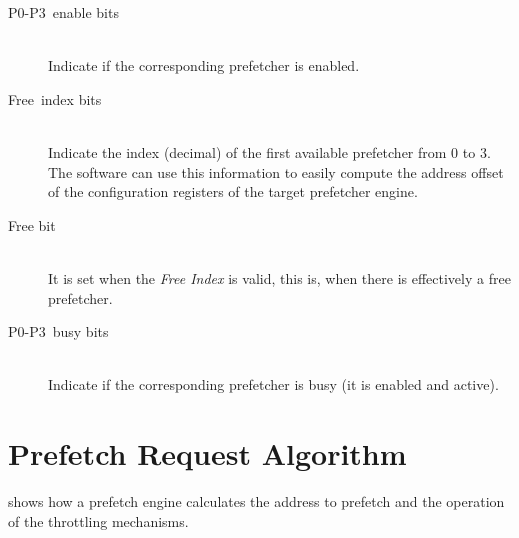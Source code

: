 \documentclass[10pt,titlepage,twoside]{book}
\begin{document}
\begin{description}
  \item [\textsf{P0-P3~enable bits}] \mbox{}\\
    Indicate if the corresponding prefetcher is enabled.

  \item [\textsf{Free~index bits}] \mbox{}\\
      Indicate the index (decimal) of the first available prefetcher from 0 to 3.
      The software can use this information to easily compute the address offset of the configuration registers of the target prefetcher engine.

  \item [\textsf{Free bit}] \mbox{}\\
    It is set when the \emph{Free Index} is valid, this is, when there is effectively a free prefetcher.

  \item [\textsf{P0-P3~busy bits}] \mbox{}\\
    Indicate if the corresponding prefetcher is busy (it is enabled and active).

\end{description}

\section{Prefetch Request Algorithm}

 shows how a prefetch engine calculates the address to prefetch and the operation of the throttling mechanisms.
\end{document}
